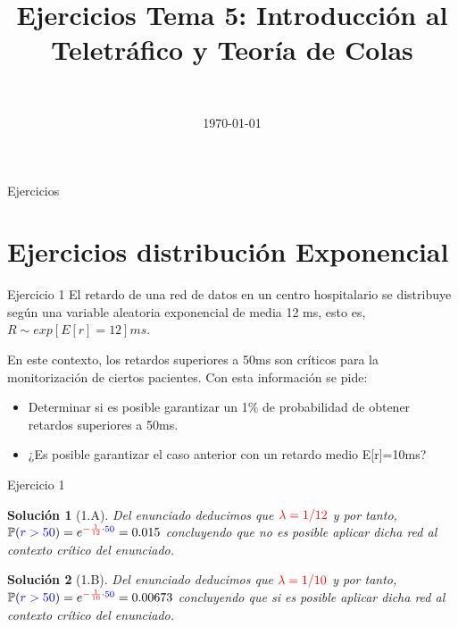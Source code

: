 \documentclass[xcolor={x11names}]{beamer}
\title[Ejercicios Tema 5]{Ejercicios Tema 5: Introducción al Teletráfico y Teoría de Colas}
\author{\textcolor{white}{RSTC curso 2022-2023}}
\date{\today}
\newtheorem{solucion}{Solución}
\newcommand{\red}[1]{{\color{red}#1}}
\newcommand{\blue}[1]{{\color{blue}#1}}
\begin{document}
\frame{\titlepage }



\begin{frame}{Ejercicios}
    \tableofcontents
\end{frame}



\section{Ejercicios distribución Exponencial}
\begin{frame}{Ejercicio 1}
    El retardo de una red de datos en un centro hospitalario se distribuye según una variable aleatoria exponencial de media 12 ms, esto es, $ R \sim exp[E[r]=12] ms $.

    En este contexto, los retardos superiores a 50ms son críticos para la monitorización de ciertos pacientes. Con esta información se pide:
    \begin{itemize}
        \item[A] Determinar si es posible garantizar un 1\% de probabilidad de obtener retardos superiores a 50ms.
        \item[B] ¿Es posible garantizar el caso anterior con un retardo medio E[r]=10ms?
    \end{itemize}
\end{frame}

\begin{frame}{Ejercicio 1}
    \begin{solucion}[1.A]
        Del enunciado deducimos que $\red{\lambda = 1/12}$ y por tanto, $ \mathbb{P}(\blue{r>50})= e^{\red{-\frac{1}{12}}\cdot \blue{50}}=0.015 $ concluyendo que no es posible aplicar dicha red al contexto crítico del enunciado.
    \end{solucion}
    \begin{solucion}[1.B]
        Del enunciado deducimos que $\red{\lambda = 1/10}$ y por tanto, $ \mathbb{P}(\blue{r>50})= e^{\red{-\frac{1}{10}}\cdot \blue{50}}=0.00673 $ concluyendo que si es posible aplicar dicha red al contexto crítico del enunciado.
    \end{solucion}
\end{frame}
\end{document}
